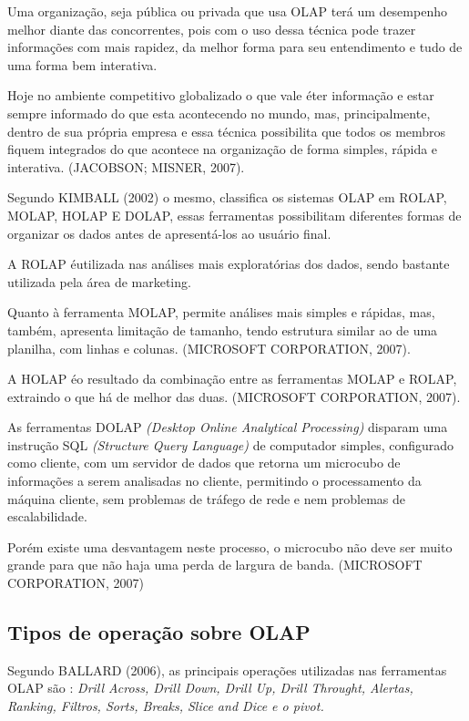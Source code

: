 Uma organiza\c{c}\~{a}o, seja pública ou privada que usa OLAP terá um desempenho melhor diante das concorrentes, pois com o uso dessa técnica pode trazer informações com mais rapidez, da melhor forma para seu entendimento e tudo de uma forma bem interativa. 

Hoje no ambiente competitivo globalizado o que vale \'{e}ter informação e estar sempre informado do que esta acontecendo no mundo, mas, principalmente, dentro de sua própria empresa e essa técnica possibilita que todos os membros fiquem integrados do que acontece na organização de forma simples, rápida e interativa. (JACOBSON; MISNER, 2007).

Segundo KIMBALL (2002) o mesmo, classifica os sistemas OLAP em ROLAP, MOLAP, HOLAP E DOLAP, essas ferramentas possibilitam diferentes formas de organizar os dados antes de apresentá-los ao usuário final.

A ROLAP \'{e}utilizada nas análises mais exploratórias dos dados, sendo bastante utilizada pela área de marketing. 

Quanto à ferramenta MOLAP, permite análises mais simples e rápidas, mas, também, apresenta limitação de tamanho, tendo estrutura similar ao de uma planilha, com linhas e colunas. (MICROSOFT CORPORATION, 2007).

A HOLAP \'{e}o resultado da combinação entre as ferramentas MOLAP e ROLAP, extraindo o que há de melhor das duas. (MICROSOFT CORPORATION, 2007).

As ferramentas DOLAP \textit{(Desktop Online Analytical Processing)} disparam uma instrução
SQL \textit{(Structure Query Language)} de computador simples, configurado como cliente, com um servidor de dados que retorna um microcubo de informações a serem analisadas no cliente, permitindo o processamento da máquina cliente, sem problemas de tráfego de rede e nem problemas de escalabilidade. 

Porém existe uma desvantagem neste processo, o microcubo não deve ser muito grande para que não haja uma perda de largura de banda. (MICROSOFT CORPORATION, 2007)

\subsection{Tipos de opera\c{c}\~{a}o sobre OLAP}

Segundo BALLARD (2006), as principais operações utilizadas nas ferramentas OLAP são : \textit{Drill Across, Drill Down, Drill Up, Drill Throught, Alertas, Ranking, Filtros, Sorts, Breaks, Slice and Dice e o pivot.}

